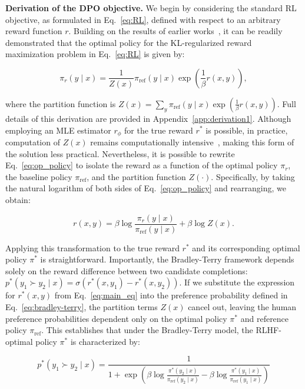 \textbf{Derivation of the DPO objective.} We begin by considering the standard RL objective, as formulated in Eq.~\ref{eq:RL}, defined with respect to an arbitrary reward function $r$. Building on the results of earlier works~\citep{peters2007reinforcement, peng2019advantage, korbak2022reinforcement, go2023aligning}, it can be readily demonstrated that the optimal policy for the KL-regularized reward maximization problem in Eq.~\ref{eq:RL} is given by:

\begin{equation}\label{eq:op_policy}
    \pi_r(y\mid x) = \frac{1}{Z(x)}\pi_\text{ref}(y\mid x)\exp\left(\frac{1}{\beta}r(x, y)\right),
\end{equation}

where the partition function is $Z(x) =\sum_{y}\pi_\text{ref}(y\mid x)\exp\left(\frac{1}{\beta}r(x, y)\right)$. Full details of this derivation are provided in Appendix~\ref{app:derivation1}. Although employing an MLE estimator $r_{\phi}$ for the true reward $r^*$ is possible, in practice, computation of $Z(x)$ remains computationally intensive~\citep{korbak2022reinforcement, go2023aligning}, making this form of the solution less practical. Nevertheless, it is possible to rewrite Eq.~\ref{eq:op_policy} to isolate the reward as a function of the optimal policy $\pi_r$, the baseline policy $\pi_\text{ref}$, and the partition function $Z(\cdot)$. Specifically, by taking the natural logarithm of both sides of Eq.~\ref{eq:op_policy} and rearranging, we obtain:

\begin{equation}\label{eq:main_eq}
    r(x,y) =\beta \log \frac{\pi_r(y\mid x)}{\pi_\text{ref}(y\mid x)} + \beta \log Z(x).
\end{equation}

Applying this transformation to the true reward $r^*$ and its corresponding optimal policy $\pi^*$ is straightforward. Importantly, the Bradley-Terry framework depends solely on the reward difference between two candidate completions: ${p^*(y_1 \succ y_2 \mid x) = \sigma(r^*(x, y_1) - r^*(x, y_2))}$. If we substitute the expression for $r^*(x, y)$ from Eq.~\ref{eq:main_eq} into the preference probability defined in Eq.~\ref{eq:bradley-terry}, the partition terms $Z(x)$ cancel out, leaving the human preference probabilities dependent only on the optimal policy $\pi^*$ and reference policy $\pi_\text{ref}$. This establishes that under the Bradley-Terry model, the RLHF-optimal policy $\pi^*$ is characterized by:

\begin{equation}\label{eq:objective}
    p^*(y_1\succ y_2 \mid x)=\frac{1}{1 + \exp\left(\beta \log \frac{\pi^*(y_2\mid x)}{\pi_\text{ref}(y_2\mid x)} - \beta \log \frac{\pi^*(y_1\mid x)}{\pi_\text{ref}(y_1\mid x)}\right)}
\end{equation}

